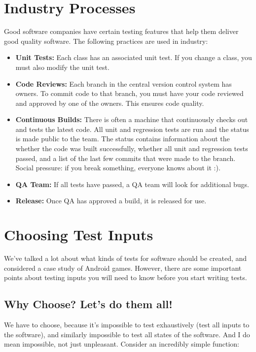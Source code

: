 \section*{Industry Processes}
Good software companies have certain testing features that help them deliver good quality software. The following practices are used in industry:

\begin{itemize}
\item \textbf{Unit Tests:} Each class has an associated unit test. If you change a class, you must also modify the unit test.

\item \textbf{Code Reviews:} Each branch in the central version control system has owners. To commit code to that branch, you must have your code reviewed and approved by one of the owners. This ensures code quality.

\item \textbf{Continuous Builds:} There is often a machine that continuously checks out and tests the latest code. All unit and regression tests are run and the status is made public to the team. The status contains information about the whether the code was built successfully, whether all unit and regression tests passed, and a list of the last few commits that were made to the branch. Social pressure: if you break something, everyone knows about it :).

\item \textbf{QA Team:} If all tests have passed, a QA team will look for additional bugs.

\item \textbf{Release:} Once QA has approved a build, it is released for use.
\end{itemize}

\section*{Choosing Test Inputs}

We've talked a lot about what kinds of tests for software should be created, and considered a case study of Android games. However, there are some important points about testing inputs you will need to know before you start writing tests. 

\subsection*{Why Choose? Let's do them all!}
We have to choose, because it's impossible to test exhaustively (test all inputs to the software), and similarly impossible to test all states of the software. And I do mean impossible, not just unpleasant. Consider an incredibly simple function:

